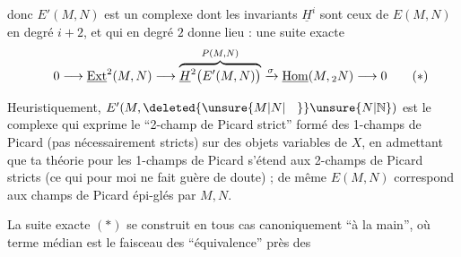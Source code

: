 
donc $E'(M,N)$ est un complexe dont les invariants $\underline{H}^{i}$ sont ceux de $E(M,N)$ en degré $i+2$, et qui en degré $2$ donne lieu : une suite exacte
\[
0\longrightarrow\underline{\mathrm{Ext}}^{2}(M,N)\longrightarrow
\overbrace{\underline{H}^{2}\bigl(E'(M,N)\bigr)}^{P(M,N)}
\xrightarrow{\sigma}\underline{\mathrm{Hom}}(M,{}_{2}N)\longrightarrow 0
\tag*{\makebox[0pt][r]{\makebox[\displaywidth][l]{$(*)$}}}
\]

Heuristiquement, $E'(M,\deleted{\unsure{M|N|\phantom{N}}}\unsure{N|\mathbb{N}})$ est le complexe qui exprime le ``2-champ de Picard strict'' formé des 1-champs de Picard (pas nécessairement stricts)  sur des objets variables de $X$, en admettant que ta théorie pour les 1-champs de Picard  s'étend aux 2-champs de Picard stricts (ce qui pour moi ne fait guère de doute) ; de même $E(M,N)$ correspond aux champs de Picard  épi-glés par $M,N$.

La suite exacte $(*)$ se construit en tous cas canoniquement ``à la main'', où  terme médian est le faisceau des    ``équivalence'' près des


